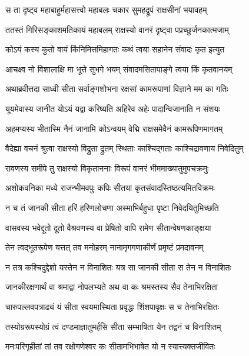 \twolineshloka
{स ता दृष्ट्व महाबाहुर्महासत्त्वो महाबलः}
{चकार सुमहद्रूपं राक्षसीनां भयावहम्} %

\twolineshloka
{ततस्तं गिरिसङ्काशमतिकायं महाबलम्}
{राक्षस्यो वानरं दृष्ट्वा पप्रच्छुर्जनकात्मजाम्} %

\twolineshloka
{कोऽयं कस्य कुतो वायं किंनिमित्तमिहागतः}
{कथं त्वया सहानेन संवादः कृत इत्युत} %

\twolineshloka
{आचक्ष्व नो विशालाक्षि मा भूत्ते सुभगे भयम्}
{संवादमसितापाङ्गे त्वया किं कृतवानयम्} %

\twolineshloka
{अथाब्रवीत्तदा साध्वी सीता सर्वाङ्गशोभना}
{रक्षसां कामरूपाणां विज्ञाने मम का गतिः} %

\twolineshloka
{यूयमेवास्य जानीत योऽयं यद्वा करिष्यति}
{अहिरेव अहेः पादान्विजानाति न संशयः} %

\twolineshloka
{अहमप्यस्य भीतास्मि नैनं जानामि कोऽन्वयम्}
{वेद्मि राक्षसमेवैनं कामरूपिणमागतम्} %

\twolineshloka
{वैदेह्या वचनं श्रुत्वा राक्षस्यो विद्रुता द्रुतम्}
{स्थिताः काश्चिद्गताः काश्चिद्रावणाय निवेदितुम्} %

\twolineshloka
{रावणस्य समीपे तु राक्षस्यो विकृताननाः}
{विरूपं वानरं भीममाख्यातुमुपचक्रमुः} %

\twolineshloka
{अशोकवनिका मध्ये राजन्भीमवपुः कपिः}
{सीतया कृतसंवादस्तिष्ठत्यमितविक्रमः} %

\twolineshloka
{न च तं जानकी सीता हरिं हरिणलोचणा}
{अस्माभिर्बहुधा पृष्टा निवेदयितुमिच्छति} %

\twolineshloka
{वासवस्य भवेद्दूतो दूतो वैश्रवणस्य वा}
{प्रेषितो वापि रामेण सीतान्वेषणकाङ्क्षया} %

\twolineshloka
{तेन त्वद्भूतरूपेण यत्तत् तव मनोहरम्}
{नानामृगगणाकीर्णं प्रमृष्टं प्रमदावनम्} %

\twolineshloka
{न तत्र कश्चिदुद्देशो यस्तेन न विनाशितः}
{यत्र सा जानकी सीता स तेन न विनाशितः} %

\twolineshloka
{जानकीरक्षणार्थं वा श्रमाद्वा नोपलभ्यते}
{अथ वा कः श्रमस्तस्य सैव तेनाभिरक्षिता} %

\twolineshloka
{चारुपल्लवपत्राढ्यं यं सीता स्वयमास्थिता}
{प्रवृद्धः शिंशपावृक्षः स च तेनाभिरक्षितः} %

\twolineshloka
{तस्योग्ररूपस्योग्रं त्वं दण्डमाज्ञातुमर्हसि}
{सीता सम्भाषिता येन तद्वनं च विनाशितम्} %

\twolineshloka
{मनःपरिगृहीतां तां तव रक्षोगणेश्वर}
{कः सीतामभिभाषेत यो न स्यात्त्यक्तजीवितः} %

